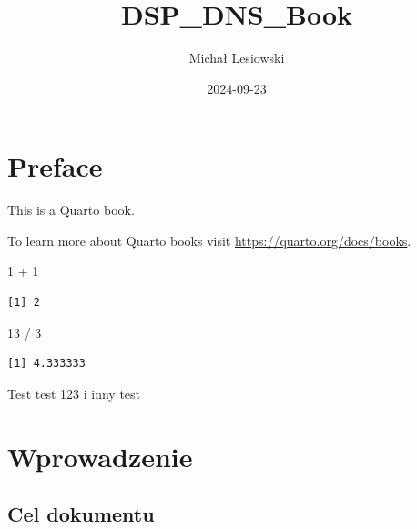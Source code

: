 \documentclass[
  a4paper,
  DIV=11,
  numbers=noendperiod,
  oneside,
  open=any]{scrreprt}
\title{DSP\_DNS\_Book}
\author{Michał Lesiowski}
\date{2024-09-23}
\newenvironment{Shaded}{\begin{snugshade}}{\end{snugshade}}
\newcommand{\DecValTok}[1]{\textcolor[rgb]{0.68,0.00,0.00}{#1}}
\newcommand{\SpecialCharTok}[1]{\textcolor[rgb]{0.37,0.37,0.37}{#1}}
\renewcommand*\contentsname{Table of contents}
\newcommand\contentsname{Table of contents}
\begin{document}
\maketitle

\renewcommand*\contentsname{Table of contents}
{
\hypersetup{linkcolor=}
\setcounter{tocdepth}{2}
\tableofcontents
}


\chapter*{Preface}\label{preface}


This is a Quarto book.

To learn more about Quarto books visit
\url{https://quarto.org/docs/books}.

\begin{Shaded}
\begin{Highlighting}[]
\DecValTok{1} \SpecialCharTok{+} \DecValTok{1}
\end{Highlighting}
\end{Shaded}

\begin{verbatim}
[1] 2
\end{verbatim}

\begin{Shaded}
\begin{Highlighting}[]
\DecValTok{13} \SpecialCharTok{/} \DecValTok{3}
\end{Highlighting}
\end{Shaded}

\begin{verbatim}
[1] 4.333333
\end{verbatim}

Test test 123 i inny test


\chapter*{Wprowadzenie}\label{wprowadzenie}


\section*{Cel dokumentu}\label{cel-dokumentu}
\end{document}
